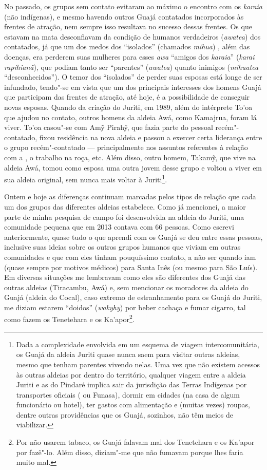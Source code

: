 No passado, os grupos sem contato evitaram ao máximo o encontro com os
\emph{karaia} (não indígenas), e mesmo havendo outros Guajá contatados
incorporados às frentes de atração, nem sempre isso resultava no sucesso
dessas frentes. Os que estavam na mata desconfiavam da condição de
humanos verdadeiros (\emph{awatea}) dos contatados, já que um dos medos
dos ``isolados'' (chamados \emph{mihua}) , além das doenças, era perderem
suas mulheres para esses \emph{awa} ``amigos dos \emph{karaia}''
(\emph{karai rapihianã}), que podiam tanto ser ``parentes''
(\emph{awatea}) quanto inimigos (\emph{mihuatea} ``desconhecidos''). O
temor dos ``isolados'' de perder suas esposas está longe de ser infundado,
tendo"-se em vista que um dos principais interesses dos homens Guajá que
participam das frentes de atração, até hoje, é a possibilidade de
conseguir novas esposas. Quando da criação do  Juriti, em 1989, além
do intérprete To'oa que ajudou no contato, outros homens da aldeia
Awá, como Kamajrua, foram lá viver. To'oa casou"-se com Amỹ Pirahỹ, que
fazia parte do pessoal recém"-contatado, fixou residência na nova aldeia
e passou a exercer certa liderança entre o grupo recém"-contatado ---
principalmente nos assuntos referentes à relação com a , o trabalho
na roça, etc. Além disso, outro homem, Takamỹ, que vive na aldeia
Awá, tomou como esposa uma outra jovem desse grupo e voltou a
viver em sua aldeia original, sem nunca mais voltar à Juriti\footnote{Dada
  a complexidade envolvida em um esquema de viagem intercomunitária, os
  Guajá da aldeia Juriti quase nunca saem para visitar outras aldeias,
  mesmo que tenham parentes vivendo nelas. Uma vez que não existem
  acessos às outras aldeias por dentro do território, qualquer viagem
  entre a aldeia Juriti e as do Pindaré implica sair da jurisdição das
  Terras Indígenas por transportes oficiais ( ou Funasa), dormir em
  cidades (na casa de algum funcionário ou hotel), ter gastos com
  alimentação e (muitas vezes) roupas, dentre outras providências que os
  Guajá, sozinhos, não têm meios de viabilizar.}.

Ontem e hoje as diferenças continuam marcadas pelos tipos de relação que
cada um dos grupos das diferentes aldeias estabelece. Como já mencionei,
a maior parte de minha pesquisa de campo foi desenvolvida na aldeia do
 Juriti, uma comunidade pequena que em 2013 contava com 66 pessoas.
Como escrevi anteriormente, quase tudo o que aprendi com os Guajá se deu
entre essas pessoas, inclusive suas ideias sobre os outros grupos
humanos que viviam em outras comunidades e que com eles tinham
pouquíssimo contato, a não ser quando iam (quase sempre por motivos
médicos) para Santa Inês (ou mesmo para São Luís). Em diversas situações
me lembravam como eles são diferentes dos Guajá das outras aldeias
(Tiracambu, Awá) e, sem mencionar os moradores da aldeia do 
Guajá (aldeia do Cocal), caso extremo de estranhamento para os Guajá do
Juriti, me diziam estarem ``doidos'' (\emph{wakyhy}) por beber cachaça e
fumar cigarro, tal como fazem os Tenetehara e os Ka'apor\footnote{Por
  não usarem tabaco, os Guajá falavam mal dos Tenetehara e os Ka'apor
  por fazê"-lo. Além disso, diziam"-me que não fumavam porque lhes faria
  muito mal.}.

